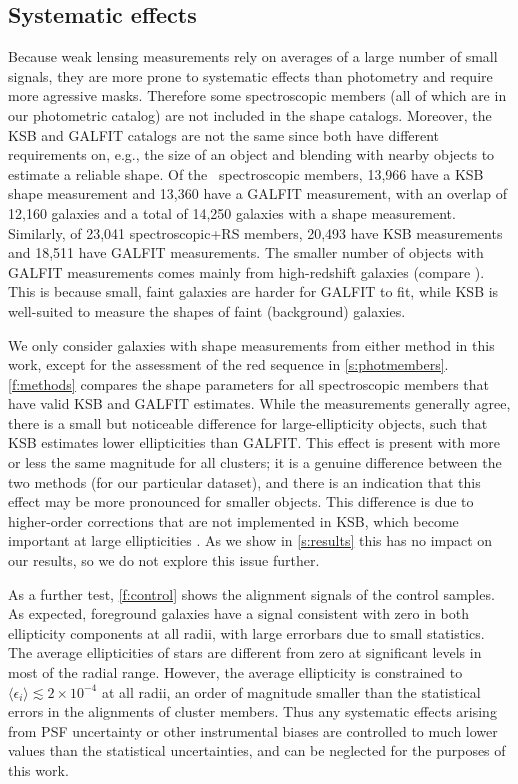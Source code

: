 \subsection{Systematic effects}\label{s:systematics}

Because weak lensing measurements rely on averages of a large number of small signals, they are 
more prone to systematic effects than photometry and require more agressive masks. Therefore some 
spectroscopic members (all of which are in our photometric catalog) are not included in the shape 
catalogs. Moreover, the KSB and GALFIT catalogs are not the same since both have different 
requirements on, e.g., the size of an object and blending with nearby objects to estimate a 
reliable shape. Of the \Nmembers\ spectroscopic members, 13,966 have a KSB shape measurement and 
13,360 have a GALFIT measurement, with an overlap of 12,160 galaxies and a total of 14,250 
galaxies with a shape measurement. Similarly, of 23,041 spectroscopic+RS members, 20,493 have KSB 
measurements and 18,511 have GALFIT measurements. The smaller number of objects with GALFIT 
measurements comes mainly from high-redshift galaxies (compare ). 
This is because small, faint galaxies are harder for GALFIT to fit, while KSB is well-suited to 
measure the shapes of faint (background) galaxies.

We only consider galaxies with shape measurements from either method in this work, except 
for the assessment of the red sequence in \cref{s:photmembers}. \cref{f:methods} compares the shape 
parameters for all spectroscopic members that have valid KSB and GALFIT estimates. While the 
measurements generally agree, there is a small but noticeable difference for large-ellipticity 
objects, such that KSB estimates lower ellipticities than GALFIT. This effect is present with more 
or less the same magnitude for all clusters; it is a genuine difference between the two methods 
(for our particular dataset), and there is an indication that this effect may be more pronounced 
for smaller objects. This difference is due to higher-order corrections that are not implemented in 
KSB, which become important at large ellipticities \citep{viola11}. As we show in \cref{s:results} 
this has no impact on our results, so we do not explore this issue further.

As a further test, \cref{f:control} shows the alignment signals of the control samples. As 
expected, foreground galaxies have a signal consistent with zero in both ellipticity components at 
all radii, with large errorbars due to small statistics. The average ellipticities of stars are 
different from zero at significant levels in most of the radial range. However, the average 
ellipticity is constrained to $\langle\epsilon_i\rangle\lesssim2\times10^{-4}$ at all radii, an 
order of magnitude smaller than the statistical errors in the alignments of cluster members. Thus 
any systematic effects arising from PSF uncertainty or other instrumental biases are controlled to 
much lower values than the statistical uncertainties, and can be neglected for the purposes of this 
work.

